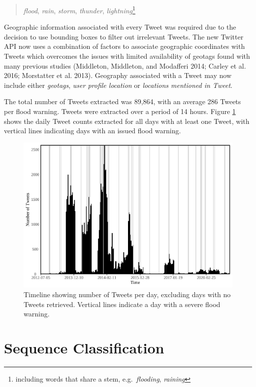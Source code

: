 \documentclass[a4paper, notitlepage]{extreport}
\begin{document}
\begin{quote}
\emph{flood}, \emph{rain}, \emph{storm}, \emph{thunder},
\emph{lightning}\footnote{including words that share a stem,
  e.g.~\emph{flooding}, \emph{raining}}
\end{quote}

Geographic information associated with every Tweet was required due to
the decision to use bounding boxes to filter out irrelevant Tweets. The
new Twitter API now uses a combination of factors to associate
geographic coordinates with Tweets which overcomes the issues with
limited availability of geotags found with many previous studies
(Middleton, Middleton, and Modafferi 2014; Carley et al. 2016;
Morstatter et al. 2013). Geography associated with a Tweet may now
include either \emph{geotags}, \emph{user profile location} or
\emph{locations mentioned in Tweet}.

The total number of Tweets extracted was 89,864, with an average 286
Tweets per flood warning. Tweets were extracted over a period of 14
hours. Figure \ref{fig:timeline} shows the daily Tweet counts extracted
for all days with at least one Tweet, with vertical lines indicating
days with an issued flood warning.

\begin{figure}[tb]

{\centering \includegraphics[width=.75\linewidth]{index_files/figure-latex/timeline-1} 

}

\caption{Timeline showing number of Tweets per day, excluding days with no Tweets retrieved. Vertical lines indicate a day with a severe flood warning.}\label{fig:timeline}
\end{figure}

\hypertarget{sequence-classification}{%
\section{Sequence Classification}\label{sequence-classification}}
\end{document}

